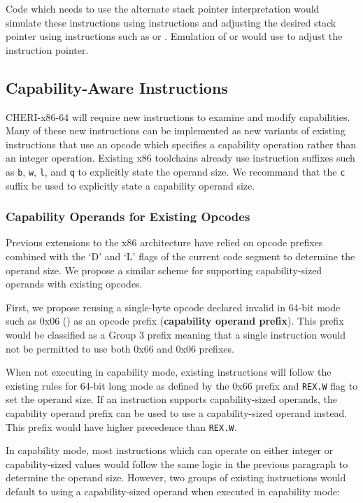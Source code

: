 Code which needs to use the alternate stack pointer
interpretation would simulate these instructions using 
instructions and adjusting the desired stack pointer using
instructions such as  or .  Emulation of
 or  would use  to
adjust the instruction pointer.

\subsection{Capability-Aware Instructions}

CHERI-x86-64 will require new instructions to examine and modify
capabilities.  Many of these new instructions can be implemented as
new variants of existing instructions that use an opcode which
specifies a capability operation rather than an integer operation.
Existing x86 toolchains already use instruction suffixes such as
\texttt{b}, \texttt{w}, \texttt{l}, and \texttt{q} to explicitly state
the operand size.  We recommand that the \texttt{c} suffix be used to
explicitly state a capability operand size.

\subsubsection{Capability Operands for Existing Opcodes}

Previous extensions to the x86 architecture have relied on opcode
prefixes combined with the `D' and `L' flags of the current code
segment to determine the operand size.  We propose a similar
scheme for supporting capability-sized operands with existing
opcodes.

First, we propose reusing a single-byte opcode declared invalid in
64-bit mode such as 0x06 () as an opcode prefix
(\textbf{capability operand prefix}).  This prefix would be classified
as a Group 3 prefix meaning that a single instruction would not be
permitted to use both 0x66 and 0x06 prefixes.

When not executing in capability mode, existing instructions will
follow the existing rules for 64-bit long mode as defined by the
0x66 prefix and \texttt{REX.W} flag to set the operand size.  If an
instruction supports capability-sized operands, the capability operand
prefix can be used to use a capability-sized operand instead.  This
prefix would have higher precedence than \texttt{REX.W}.

In capability mode, most instructions which can operate on either
integer or capability-sized values would follow the same logic in the
previous paragraph to determine the operand size.  However, two groups
of existing instructions would default to using a capability-sized
operand when executed in capability mode:

